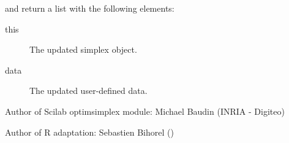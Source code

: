 %
\begin{Value}
 and  return a
list with the following elements: \begin{description}

\item[this] The updated simplex object.
\item[data] The updated user-defined data.

\end{description}

\end{Value}
%
\begin{Author}\relax
Author of Scilab optimsimplex module: Michael Baudin (INRIA - Digiteo)

Author of R adaptation: Sebastien Bihorel ()
\end{Author}
%
\begin{SeeAlso}\relax
{}
\end{SeeAlso}
